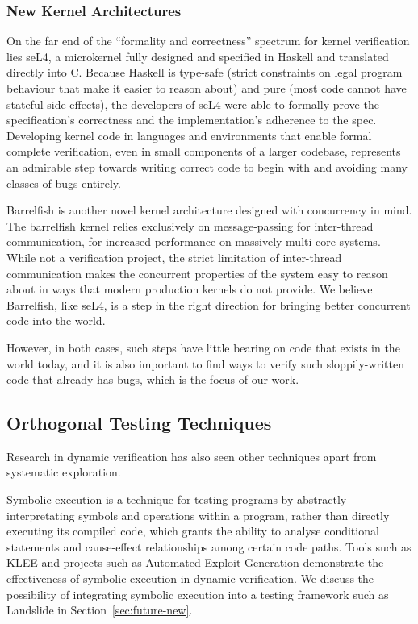 \subsubsection{New Kernel Architectures}

On the far end of the ``formality and correctness'' spectrum for kernel verification lies seL4\hspace{0in}\cite{sel4}, a microkernel fully designed and specified in Haskell and translated directly into C. Because Haskell is type-safe (strict constraints on legal program behaviour that make it easier to reason about) and pure (most code cannot have stateful side-effects), the developers of seL4 were able to formally prove the specification's correctness and the implementation's adherence to the spec.
Developing kernel code in languages and environments that enable formal complete verification, even in small components of a larger codebase, represents an admirable step towards writing correct code to begin with and avoiding many classes of bugs entirely.

Barrelfish\cite{barrelfish} is another novel kernel architecture designed with concurrency in mind. The barrelfish kernel relies exclusively on message-passing for inter-thread communication, for increased performance on massively multi-core systems. While not a verification project, the strict limitation of inter-thread communication makes the concurrent properties of the system easy to reason about in ways that modern production kernels do not provide.
We believe Barrelfish, like seL4, is a step in the right direction for bringing better concurrent code into the world.

However, in both cases, such steps have little bearing on code that exists in the world today, and it is also important to find ways to verify such sloppily-written code that already has bugs, which is the focus of our work.

\subsection{Orthogonal Testing Techniques}

Research in dynamic verification has also seen other techniques apart from systematic exploration.

Symbolic execution\cite{symbolic,symbolic-disks} is a technique for testing programs by abstractly interpretating symbols and operations within a program, rather than directly executing its compiled code, which grants the ability to analyse conditional statements and cause-effect relationships among certain code paths.
Tools such as KLEE\cite{klee} and projects such as Automated Exploit Generation\cite{aeg} demonstrate the effectiveness of symbolic execution in dynamic verification.
We discuss the possibility of integrating symbolic execution into a testing framework such as Landslide in Section~\ref{sec:future-new}.

